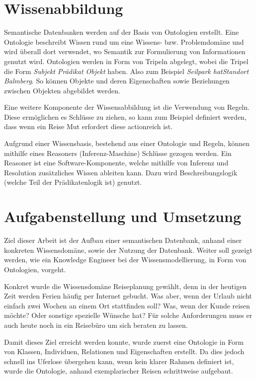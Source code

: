 \documentclass[
    paper=a4,               %
    fontsize=10pt,          %
    open=right,             %
    titlepage=false,        %
    parskip=half,           %
]{scrreprt}                 %
\begin{document}
    \begin{multicols}{3}
        \section*{Wissenabbildung}
        Semantische Datenbanken werden auf der Basis von Ontologien erstellt. Eine Ontologie beschreibt Wissen rund um eine Wissens- bzw. Problemdomäne und wird überall dort verwendet, wo Semantik zur Formulierung von Informationen genutzt wird.  Ontologien werden in Form von Tripeln abgelegt, wobei die Tripel die Form \textit{Subjekt Prädikat Objekt} haben. Also zum Beispiel \textit{Seilpark hatStandort Balmberg}. So können Objekte und deren Eigenschaften sowie Beziehungen zwischen Objekten abgebildet werden.

        Eine weitere Komponente der Wissensabbildung ist die Verwendung von Regeln. Diese ermöglichen es Schlüsse zu ziehen, so kann zum Beispiel definiert werden, dass wenn ein Reise Mut erfordert diese actionreich ist.
        
        Aufgrund einer Wissensbasis, bestehend aus einer Ontologie und Regeln, können mithilfe eines Reasoners (Inferenz-Maschine) Schlüsse gezogen werden.
        Ein Reasoner ist eine Software-Komponente, welche mithilfe von Inferenz und Resolution zusätzliches Wissen ableiten kann. Dazu wird Beschreibungslogik (welche Teil der Prädikatenlogik ist) genutzt.

        \section*{Aufgabenstellung und Umsetzung}
        Ziel dieser Arbeit ist der Aufbau einer semantischen Datenbank, anhand einer konkreten Wissensdomäne, sowie der Nutzung der Datenbank. Weiter soll gezeigt werden, wie ein Knowledge Engineer bei der Wissensmodellierung, in Form von Ontologien, vorgeht.

        Konkret wurde die Wissensdomäne Reiseplanung gewählt, denn in der heutigen Zeit werden Ferien häufig per Internet gebucht. Was aber, wenn der Urlaub nicht einfach zwei Wochen an einem Ort stattfinden soll? Was, wenn der Kunde reisen möchte? Oder sonstige spezielle Wünsche hat? Für solche Anforderungen muss er auch heute noch in ein Reisebüro um sich beraten zu lassen.

        Damit dieses Ziel erreicht werden konnte, wurde zuerst eine Ontologie in Form von Klassen, Individuen, Relationen und Eigenschaften erstellt. Da dies jedoch schnell ins Uferlose übergehen kann, wenn kein klarer Rahmen definiert ist, wurde die Ontologie, anhand exemplarischer Reisen schrittweise aufgebaut.


\end{multicols}
\end{document}
